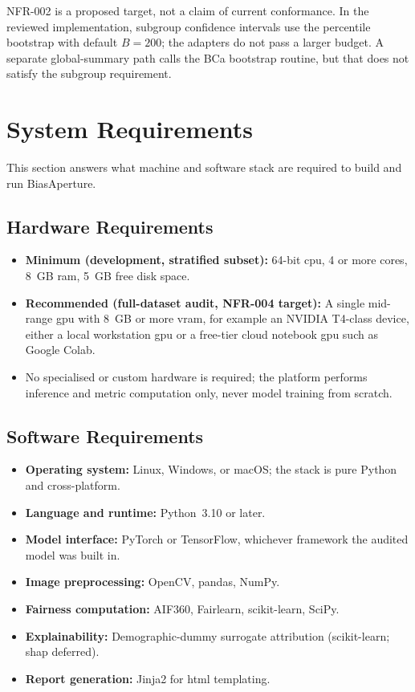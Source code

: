 NFR-002 is a proposed target, not a claim of current conformance. In the reviewed implementation, subgroup confidence intervals use the percentile bootstrap with default \(B=200\); the adapters do not pass a larger budget. A separate global-summary path calls the BCa bootstrap routine, but that does not satisfy the subgroup requirement.

\section{System Requirements}
This section answers what machine and software stack are required to build and run BiasAperture.

\subsection{Hardware Requirements}
\begin{itemize}
    \item \textbf{Minimum (development, stratified subset):} 64-bit \gls{cpu}, 4 or more cores, 8~GB \gls{ram}, 5~GB free disk space.
    \item \textbf{Recommended (full-dataset audit, NFR-004 target):} A single mid-range \gls{gpu} with 8~GB or more \gls{vram}, for example an NVIDIA T4-class device, either a local workstation \gls{gpu} or a free-tier cloud notebook \gls{gpu} such as Google Colab.
    \item No specialised or custom hardware is required; the platform performs inference and metric computation only, never model training from scratch.
\end{itemize}

\subsection{Software Requirements}
\begin{itemize}
    \item \textbf{Operating system:} Linux, Windows, or macOS; the stack is pure Python and cross-platform.
    \item \textbf{Language and runtime:} Python~3.10 or later.
    \item \textbf{Model interface:} PyTorch or TensorFlow, whichever framework the audited model was built in.
    \item \textbf{Image preprocessing:} OpenCV, pandas, NumPy.
    \item \textbf{Fairness computation:} AIF360, Fairlearn, scikit-learn, SciPy.
    \item \textbf{Explainability:} Demographic-dummy surrogate attribution (scikit-learn; \gls{shap} deferred).
    \item \textbf{Report generation:} Jinja2 for \gls{html} templating.
\end{itemize}